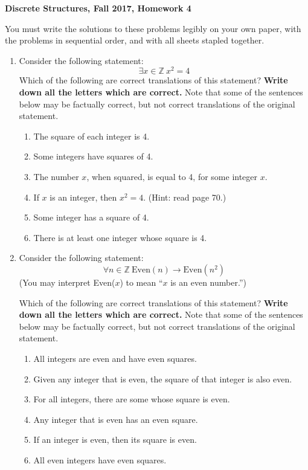 \documentclass[12pt, letterpaper]{report}
\newcommand{\Z}{\mathbb{Z}}
\begin{document}
{\textbf{Discrete Structures, Fall 2017, Homework 4}}

\medbreak

You must write the solutions to these problems legibly on your own paper, with
the problems in sequential order, and with all sheets stapled together.

\begin{enumerate}

\item Consider the following statement:
$$\exists x \in \Z \ x^2=4$$
Which of the following are correct translations of this statement?  \textbf{Write down all the letters which are correct.}
Note that some of the sentences below may be factually correct, but not correct translations of the original statement.
\begin{enumerate}
        \item The square of each integer is 4.
        \item Some integers have squares of 4.
        \item The number $x$, when squared, is equal to 4, for some integer $x$.
        \item If $x$ is an integer, then $x^2=4$.  (Hint: read page 70.)
        \item Some integer has a square of 4.
        \item There is at least one integer whose square is 4.
\end{enumerate}

\item Consider the following statement:
$$\forall n \in \Z \ \text{Even}(n) \to \text{Even}(n^2)$$
(You may interpret Even($x$) to mean ``$x$ is an even number.'')

Which of the following are correct translations of this statement?  \textbf{Write down all the letters which are correct.}
Note that some of the sentences below may be factually correct, but not correct translations of the original statement.
\begin{enumerate}
        \item All integers are even and have even squares.
        \item Given any integer that is even, the square of that integer is also even.
        \item For all integers, there are some whose square is even.
        \item Any integer that is even has an even square.
        \item If an integer is even, then its square is even.
        \item All even integers have even squares.
\end{enumerate}


\end{enumerate}
\end{document}
